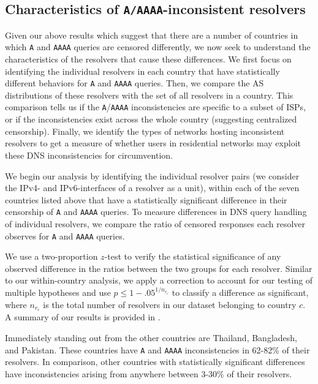 \subsection{Characteristics of {\tt A/AAAA}-inconsistent resolvers}
\label{sec:resources:resolvers}
Given our above results which suggest that there are a number of countries in
which {\tt A} and {\tt AAAA} queries are censored differently, we now seek to
understand the characteristics of the resolvers that cause these differences.
%
We first focus on identifying the individual resolvers in each country that
have statistically different behaviors for {\tt A} and {\tt AAAA} queries.
Then, we compare the AS distributions of these resolvers with the set of all
resolvers in a country. This comparison tells us if the {\tt A}/{\tt AAAA}
inconsistencies are specific to a subset of ISPs, or if the inconsistencies
exist across the whole country (suggesting centralized censorship).
Finally, we identify the
types of networks hosting inconsistent resolvers to get a measure of whether
users in residential networks may exploit these DNS inconsistencies for
circumvention.

%
We begin our analysis by identifying the individual resolver pairs (\ie we
consider the IPv4- and IPv6-interfaces of a resolver as a unit), within each
of the seven countries listed above that have a statistically significant
difference in their censorship of {\tt A} and {\tt AAAA} queries.
%
To measure differences in DNS query handling of individual resolvers, we
compare the ratio of censored responses each resolver observes for {\tt A} and
{\tt AAAA} queries.

%
We use a two-proportion $z$-test to verify the statistical significance of any
observed difference in the ratios between the two groups for each resolver.
Similar to our within-country analysis, we apply a \Sidak correction to account
for our testing of multiple hypotheses and use $p \leq 1-{.05}^{1/n_{r_c}}$ to
classify a difference as significant, where $n_{r_c}$ is the total number of
resolvers in our dataset belonging to country $c$.
%
A summary of our results is provided in . 

%
Immediately standing out from the other countries are Thailand, Bangladesh, and
Pakistan. These countries have {\tt A} and {\tt AAAA} inconsistencies in
62-82\% of their resolvers. In comparison, other countries with
statistically significant differences have inconsistencies arising from
anywhere between 3-30\% of their resolvers.
%

